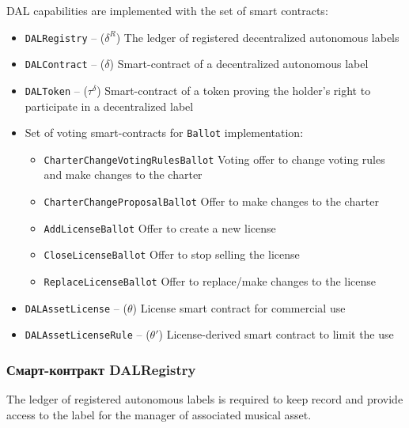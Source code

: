 \documentclass[12pt]{report}
\newcommand{\hlc}[1]{\colorbox{yellow!25}{#1}}
\def\code#1{\colorbox{light-gray}{\texttt{#1}}}
\begin{document}
DAL capabilities are implemented with the set of smart contracts:
\begin{itemize}
	\item\code{DALRegistry} – ($\delta^R$)\hfill\null\linebreak
	The ledger of registered decentralized autonomous labels
	\item\code{DALContract} – ($\delta$)\hfill\null\linebreak
	Smart-contract of a decentralized autonomous label
	\item\code{DALToken} – ($\tau^\delta$)\hfill\null\linebreak
	Smart-contract of a token proving the holder's right to participate in a decentralized label
	\item \hlc{Set of voting smart-contracts} for \code{Ballot} implementation:
	\begin{itemize}
		\item\code{CharterChangeVotingRulesBallot}
		Voting offer to change voting rules and make changes to the charter
		\item\code{CharterChangeProposalBallot}\hfill\null\linebreak
		Offer to make changes to the charter
		\item\code{AddLicenseBallot}\hfill\null\linebreak
		Offer to create a new license
		\item\code{CloseLicenseBallot}\hfill\null\linebreak
		Offer to stop selling the license
		\item\code{ReplaceLicenseBallot}\hfill\null\linebreak
		Offer to replace/make changes to the license
	\end{itemize}
\item\code{DALAssetLicense} – ($\theta$)\hfill\null\linebreak
License smart contract for commercial use
\item\code{DALAssetLicenseRule} – ($\theta'$)\hfill\null\linebreak
License-derived smart contract to limit the use 
\end{itemize}
\vfill\null\pagebreak
\subsubsection{Смарт-контракт DALRegistry}
\label{tech-apps-dal-registry}
The ledger of registered autonomous labels is required to keep record and provide access to the label for the manager of associated musical asset.
\end{document}
